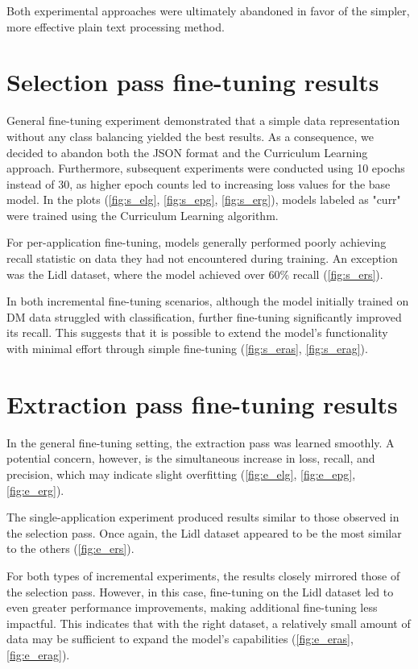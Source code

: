 \documentclass[licencjacka,en]{pracamgr}
\begin{document}
Both experimental approaches were ultimately abandoned in favor of the simpler, more effective plain text processing method.

\section{Selection pass fine-tuning results}
General fine-tuning experiment demonstrated that a simple data representation without any class balancing yielded the best results. As a consequence, we decided to abandon both the JSON format and the Curriculum Learning approach. Furthermore, subsequent experiments were conducted using 10 epochs instead of 30, as higher epoch counts led to increasing loss values for the base model. In the plots (\ref{fig:s_elg}, \ref{fig:s_epg}, \ref{fig:s_erg}), models labeled as "curr" were trained using the Curriculum Learning algorithm.

For per-application fine-tuning, models generally performed poorly achieving recall statistic on data they had not encountered during training. An exception was the Lidl dataset, where the model achieved over 60\% recall (\ref{fig:s_ers}).

In both incremental fine-tuning scenarios, although the model initially trained on DM data struggled with classification, further fine-tuning significantly improved its recall. This suggests that it is possible to extend the model's functionality with minimal effort through simple fine-tuning (\ref{fig:s_eras}, \ref{fig:s_erag}).

\section{Extraction pass fine-tuning results}
In the general fine-tuning setting, the extraction pass was learned smoothly. A potential concern, however, is the simultaneous increase in loss, recall, and precision, which may indicate slight overfitting (\ref{fig:e_elg}, \ref{fig:e_epg}, \ref{fig:e_erg}).

The single-application experiment produced results similar to those observed in the selection pass. Once again, the Lidl dataset appeared to be the most similar to the others (\ref{fig:e_ers}).

For both types of incremental experiments, the results closely mirrored those of the selection pass. However, in this case, fine-tuning on the Lidl dataset led to even greater performance improvements, making additional fine-tuning less impactful. This indicates that with the right dataset, a relatively small amount of data may be sufficient to expand the model’s capabilities (\ref{fig:e_eras}, \ref{fig:e_erag}).
\end{document}
